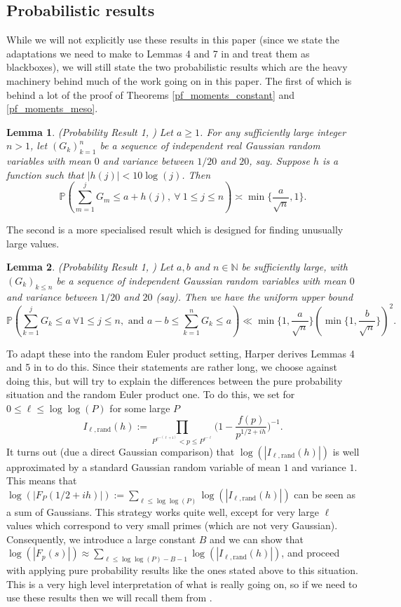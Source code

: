 \documentclass[10pt,a4paper]{amsart}
\newtheorem{lemma}{Lemma}
\numberwithin{equation}{section}
\newcommand{\Prob}{\mathbb{P}}
\begin{document}
\subsection{Probabilistic results} \label{prob_heur}
While we will not explicitly use these results in this paper (since we state the adaptations we need to make to Lemmas 4 and 7 in \cite{harper2019partition} and treat them as blackboxes), we will still state the two probabilistic results which are the heavy machinery behind much of the work going on in this paper. The first of which is behind a lot of the proof of Theorems \ref{pf_moments_constant} and \ref{pf_moments_meso}.
\begin{lemma}
    (Probability Result 1, \cite{aharper201}) Let $a\geqslant 1$. For any sufficiently large integer $n > 1$, let $(G_k)_{k=1}^n$ be a sequence of independent real Gaussian random variables with mean $0$ and variance between $1/20$ and $20$, say. Suppose $h$ is a function such that $|h(j)| < 10\log(j)$. Then
    $$\Prob(\sum_{m=1}^j G_m \leqslant a + h(j),  \ \forall \ 1 \leqslant j \leqslant n ) \asymp \min\big\{\frac{a}{\sqrt{n}},1\big\}.$$ \label{ballot}
\end{lemma}
The second is a more specialised result which is designed for finding unusually large values.
\begin{lemma}
    (Probability Result 1, \cite{harper2019partition}) Let $a,b$ and $n \in \mathbb{N}$ be sufficiently large, with $(G_k)_{k \leq n}$ be a sequence of independent Gaussian random variables with mean $0$ and variance between $1/20$ and $20$ (say). Then we have the uniform upper bound
    $$\mathbb{P}(\sum_{k=1}^jG_k \leq a \ \forall1 \leq j \leq n, \text{ and } a-b \leq \sum_{k=1}^nG_k \leq a) \ll \min\big\{1,\frac{a}{\sqrt{n}}\big\}(\min\big\{1,\frac{b}{\sqrt{n}}\big\})^2.$$
\end{lemma}
To adapt these into the random Euler product setting, Harper derives Lemmas 4 and 5 in \cite{aharper201} to do this. Since their statements are rather long, we choose against doing this, but will try to explain the differences between the pure probability situation and the random Euler product one. To do this, we set for $0 \leq \ell \leq \log\log(P)$ for some large $P$
$$I_{\ell,\text{rand}}(h):=\prod_{P^{e^{-(\ell+1)}}< p \leq P^{e^{-\ell}}}\big(1-\frac{f(p)}{p^{1/2+ih}}\big)^{-1}.$$
It turns out (due a direct Gaussian comparison) that $\log(|I_{\ell,\text{rand}}(h)|)$ is well approximated by a standard Gaussian random variable of mean $1$ and variance $1$. This means that $\log(|F_P(1/2+ih)|) := \sum_{\ell \leq \log\log(P)}\log(|I_{\ell,\text{rand}}(h)|)$ can be seen as a sum of Gaussians. This strategy works quite well, except for very large $\ell$ values which correspond to very small primes (which are not very Gaussian). Consequently, we introduce a large constant $B$ and we can show that $\log(|F_p(s)|) \approx \sum_{\ell \leq \log\log(P)-B-1}\log(|I_{\ell,\text{rand}}(h)|)$, and proceed with applying pure probability results like the ones stated above to this situation. This is a very high level interpretation of what is really going on, so if we need to use these results then we will recall them from \cite{aharper201}.  
\end{document}
